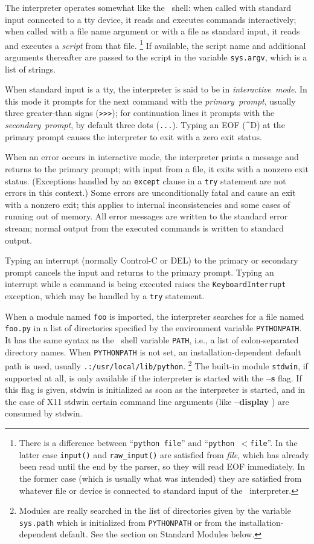 The interpreter operates somewhat like the \UNIX\ shell: when called with
standard input connected to a tty device, it reads and executes commands
interactively; when called with a file name argument or with a file as
standard input, it reads and executes a
{\it script}
from that file.%
\footnote{
	There is a difference between ``{\tt python file}'' and
	``{\tt python $<$file}''.  In the latter case {\tt input()} and
	{\tt raw\_input()} are satisfied from {\it file}, which has
	already been read until the end by the parser, so they will read
	EOF immediately.  In the former case (which is usually what was
	intended) they are satisfied from whatever file or device is
	connected to standard input of the \Python\ interpreter.
}
If available, the script name and additional arguments thereafter are
passed to the script in the variable
{\tt sys.argv},
which is a list of strings.

When standard input is a tty, the interpreter is said to be in
{\it interactive\ mode}.
In this mode it prompts for the next command with the
{\it primary\ prompt},
usually three greater-than signs ({\tt >>>}); for continuation lines
it prompts with the
{\it secondary\ prompt},
by default three dots ({\tt ...}).
Typing an EOF (\^{}D) at the primary prompt causes the interpreter to exit
with a zero exit status.

When an error occurs in interactive mode, the interpreter prints a
message and returns to the primary prompt; with input from a file, it
exits with a nonzero exit status.
(Exceptions handled by an
{\tt except}
clause in a
{\tt try}
statement are not errors in this context.)
Some errors are unconditionally fatal and cause an exit with a nonzero
exit; this applies to internal inconsistencies and some cases of running
out of memory.
All error messages are written to the standard error stream; normal
output from the executed commands is written to standard output.

Typing an interrupt (normally Control-C or DEL) to the primary or
secondary prompt cancels the input and returns to the primary prompt.
Typing an interrupt while a command is being executed raises the
{\tt KeyboardInterrupt}
exception, which may be handled by a
{\tt try}
statement.

When a module named
{\tt foo}
is imported, the interpreter searches for a file named
{\tt foo.py}
in a list of directories specified by the environment variable
{\tt PYTHONPATH}.
It has the same syntax as the \UNIX\ shell variable
{\tt PATH},
i.e., a list of colon-separated directory names.
When
{\tt PYTHONPATH}
is not set, an installation-dependent default path is used, usually
{\tt .:/usr/local/lib/python}.%
\footnote{
	Modules are really searched in the list of directories given by
	the variable {\tt sys.path} which is initialized from
	{\tt PYTHONPATH} or from the installation-dependent default.
	See the section on Standard Modules below.
}
The built-in module
{\tt stdwin},
if supported at all, is only available if the interpreter is started
with the
{\bf --s}
flag.
If this flag is given, stdwin is initialized as soon as the interpreter
is started, and in the case of X11 stdwin certain command line arguments
(like
{\bf --display} )
are consumed by stdwin.

